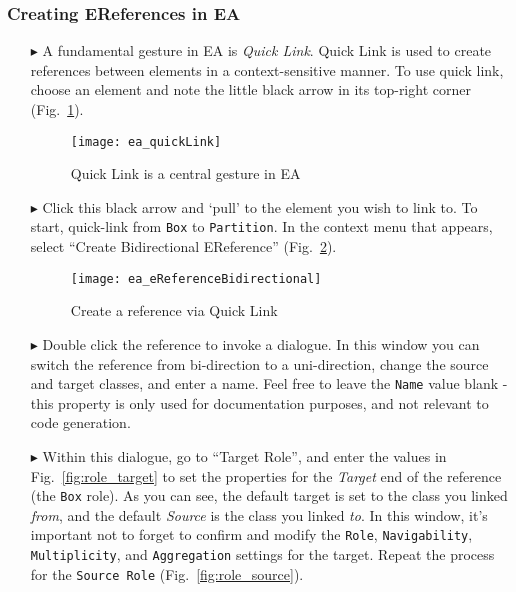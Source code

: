 \newpage
\subsubsection{Creating EReferences in EA}
\visHeader
\hypertarget{static:references vis}{}

\begin{itemize}

\item[$\blacktriangleright$] A fundamental gesture in EA is \emph{Quick Link}. Quick Link is used to create references between elements in a context-sensitive
manner. To use quick link, choose an element and note the little black arrow in its top-right corner (Fig.~\ref{fig:quicklink}).

\begin{figure}[htbp]
	\centering
  \texttt{[image: ea\_quickLink]}
	\caption{Quick Link is a central gesture in EA}
	\label{fig:quicklink}
\end{figure}
\FloatBarrier

\item[$\blacktriangleright$] Click this black arrow and `pull' to the element you wish to link to. To start, quick-link from \texttt{Box} to \texttt{Partition}.
In the context menu that appears, select ``Create Bidirectional EReference'' (Fig.~\ref{fig:ereference}).

\begin{figure}[htbp]
	\centering
  \texttt{[image: ea\_eReferenceBidirectional]}
	\caption{Create a reference via Quick Link}
	\label{fig:ereference}
\end{figure}
\FloatBarrier

\item[$\blacktriangleright$] Double click the reference to invoke a dialogue. In this window you can switch the reference from bi-direction to a uni-direction,
change the source and target classes, and enter a name. Feel free to leave the \texttt{Name} value blank - this property is only used for documentation purposes, and not
relevant to code generation.

\item[$\blacktriangleright$] Within this dialogue, go to ``Target Role'', and enter the values in Fig.~\ref{fig:role_target} to set the properties for the
\emph{Target} end of the reference (the \texttt{Box} role). As you can see, the default target is set to the class you linked \emph{from}, and the default
\emph{Source} is the class you linked \emph{to}. In this window, it's important not to forget to confirm and modify the \texttt{Role}, \texttt{Navigability},
\texttt{Multiplicity}, and \texttt{Aggregation} settings for the target.  Repeat the process for the \texttt{Source Role} (Fig.~\ref{fig:role_source}).


\end{itemize}
